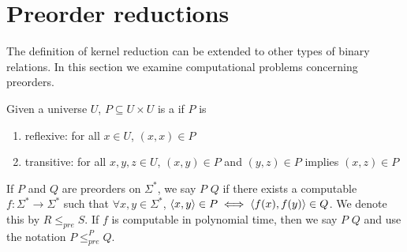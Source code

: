 \newcommand{\pr}{\leq^{P}_{pre}} %
\newcommand{\prnt}{\leq_{pre}} %
\newcommand{\algr}{\leq^{P}_{alg}} %
\newcommand{\algrnt}{\leq_{alg}} %

\section{Preorder reductions}

The definition of kernel reduction can be extended to other types of binary relations.
In this section we examine computational problems concerning preorders.

Given a universe $U$, $P\subseteq U\times U$ is a  if $P$ is
\begin{enumerate}
\item reflexive: for all $x\in U$, $(x,x)\in P$
\item transitive: for all $x,y,z\in U$, $(x,y)\in P$ and $(y,z)\in P$ implies $(x,z)\in P$
\end{enumerate}

If $P$ and $Q$ are preorders on $\Sigma^*$, we say $P$  $Q$ if there exists a computable $f\colon\Sigma^*\to\Sigma^*$ such that $\forall x,y\in\Sigma^*$, $\left\langle x,y\right\rangle\in P\iff \left\langle f(x),f(y)\right\rangle\in Q$.
We denote this by $R\prnt S$.
If $f$ is computable in polynomial time, then we say $P$  $Q$ and use the notation $P\pr Q$.

